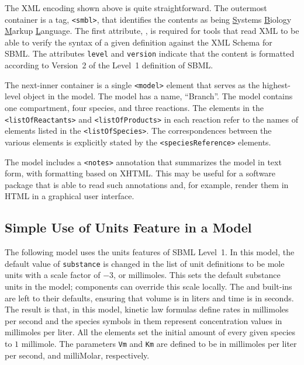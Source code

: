 \documentclass[10pt]{cekarticle}
\newcommand{\changed}[1]{\textcolor{BrickRed}{#1}}
\newenvironment{blockChanged}{\color{BrickRed}}{}
\begin{document}
\begin{blockChanged}
The XML encoding shown above is quite straightforward. The outermost
container is a tag, \texttt{<smbl>}, that identifies the contents as being
\underline{S}ystems \underline{B}iology \underline{M}arkup
\underline{L}anguage.  The first attribute, , is required for
tools that read XML to be able to verify the syntax of a given definition
against the XML Schema for SBML.  The attributes \texttt{level} and
\texttt{version} indicate that the content is formatted according to
Version~2 of the Level~1 definition of SBML.
\end{blockChanged}

The next-inner container is a single \texttt{<model>} element that serves
as the highest-level object in the model.  The model has a name,
``Branch''.  The model contains one compartment, four species, and three
reactions.  The elements in the \texttt{<listOfReactants>} and
\texttt{<listOfProducts>} in each reaction refer to the names of elements
listed in the \texttt{<listOfSpecies>}.  The correspondences between the
various elements is explicitly stated by the
\changed{\texttt{<speciesReference>}} elements.

The model includes a \texttt{<notes>} annotation that summarizes the model
in text form, with formatting based on XHTML.  This may be useful for a
software package that is able to read such annotations and, for example,
render them in HTML in a graphical user interface.


\subsection{Simple Use of Units Feature in a Model}
\label{apdx:units-eg}

The following model uses the units features of SBML Level~1.  In this
model, the default value of \texttt{substance} is changed in the list of
unit definitions to be mole units with a scale factor of $-3$, or
millimoles.  This sets the default substance units in the model; components
can override this scale locally.  The  and 
built-ins are left to their defaults, ensuring that volume is in liters and
time is in seconds.  The result is that, in this model, kinetic law
formulas define rates in millimoles per second and the \changed{species}
symbols in them represent concentration values in millimoles per liter.
All the \changed{} elements set the initial amount of every
given \changed{species} to $1$ millimole.  The parameters \texttt{Vm} and
\texttt{Km} are defined to be in millimoles per liter per second, and
milliMolar, respectively.
\end{document}
